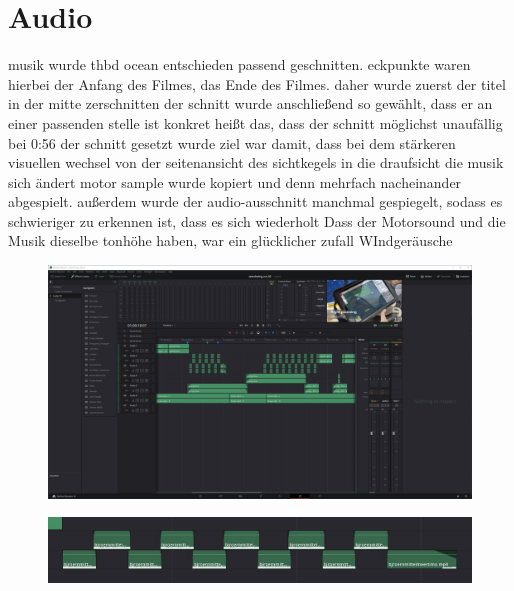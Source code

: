 \section{Audio}

musik wurde thbd ocean entschieden
passend geschnitten. eckpunkte waren hierbei der Anfang des Filmes, das Ende des Filmes.
daher wurde zuerst der titel in der mitte zerschnitten
der schnitt wurde anschließend so gewählt, dass er an einer passenden stelle ist
konkret heißt das, dass der schnitt möglichst unaufällig bei 0:56 der schnitt gesetzt wurde
ziel war damit, dass bei dem stärkeren visuellen wechsel von der seitenansicht des sichtkegels in die draufsicht die musik sich ändert
motor sample wurde kopiert und denn mehrfach nacheinander abgespielt. außerdem wurde der audio-ausschnitt manchmal gespiegelt, sodass es schwieriger zu erkennen ist, dass es sich wiederholt
Dass der Motorsound und die Musik dieselbe tonhöhe haben, war ein glücklicher zufall
WIndgeräusche


\begin{figure}[H]
\begin{center}
\includegraphics[width=\textwidth]{gfx/post/resolve1.jpg}
\caption{}
\label{resolve1}
\end{center}
\end{figure}

\begin{figure}[H]
\begin{center}
\includegraphics[width=\textwidth]{gfx/post/sample.jpg}
\caption{}
\label{sample}
\end{center}
\end{figure}